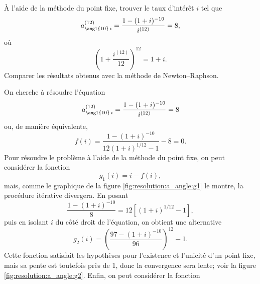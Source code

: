 \begin{exercice}
  À l'aide de la méthode du point fixe, trouver le taux d'intérêt $i$
  tel que
  \begin{displaymath}
    a_{\angl{10}\,i}^{(12)} = \frac{1- (1 + i)^{-10}}{i^{(12)}} = 8,
  \end{displaymath}
  où
  \begin{displaymath}
    \left( 1 + \frac{i^{(12)}}{12} \right)^{12} = 1 + i.
  \end{displaymath}
  Comparer les résultats obtenus avec la méthode de Newton--Raphson.
  \begin{sol}
    On cherche à résoudre l'équation
    \begin{displaymath}
      a_{\angl{10}\,i}^{(12)} = \frac{1- (1 + i)^{-10}}{i^{(12)}} = 8
    \end{displaymath}
    ou, de manière équivalente,
    \begin{displaymath}
      f(i) = \frac{1 - (1 + i)^{-10}}{12 (1 + i)^{1/12} - 1} - 8 = 0.
    \end{displaymath}
    Pour résoudre le problème à l'aide de la méthode du point fixe, on
    peut considérer la fonction
    \begin{displaymath}
      g_1(i) = i - f(i),
    \end{displaymath}
    mais, comme le graphique de la figure \ref{fig:resolution:a_angle:g1} le
    montre, la procédure itérative divergera. En posant
    \begin{displaymath}
      \frac{1 - (1 + i)^{-10}}{8} = 12[(1 + i)^{1/12} - 1],
    \end{displaymath}
    puis en isolant $i$ du côté droit de l'équation, on obtient une
    alternative
    \begin{displaymath}
      g_2(i) = \left( \frac{97 - (1 + i)^{-10}}{96} \right)^{12} - 1.
    \end{displaymath}
    Cette fonction satisfait les hypothèses pour l'existence et
    l'unicité d'un point fixe, mais sa pente est toutefois près de 1,
    donc la convergence sera lente; voir la figure
    \ref{fig:resolution:a_angle:g2}. Enfin, on peut considérer la fonction

\end{sol}
\end{exercice}
